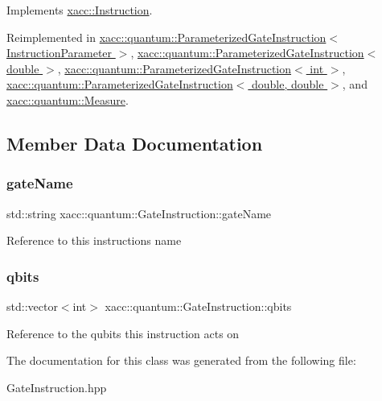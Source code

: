 Implements \hyperlink{a02460_ae94c2d089908294c1d410b14c96817ae}{xacc\+::\+Instruction}.



Reimplemented in \hyperlink{a01280_aaccc4a20d58d2ac5c31abe7e325b8f77}{xacc\+::quantum\+::\+Parameterized\+Gate\+Instruction$<$ Instruction\+Parameter $>$}, \hyperlink{a01280_aaccc4a20d58d2ac5c31abe7e325b8f77}{xacc\+::quantum\+::\+Parameterized\+Gate\+Instruction$<$ double $>$}, \hyperlink{a01280_aaccc4a20d58d2ac5c31abe7e325b8f77}{xacc\+::quantum\+::\+Parameterized\+Gate\+Instruction$<$ int $>$}, \hyperlink{a01280_aaccc4a20d58d2ac5c31abe7e325b8f77}{xacc\+::quantum\+::\+Parameterized\+Gate\+Instruction$<$ double, double $>$}, and \hyperlink{a01312_a1c51a5d68294dcb2ba1a9fbea63a730f}{xacc\+::quantum\+::\+Measure}.



\subsection{Member Data Documentation}
\mbox{\label{a01276_a9961e6979139ced70300188cf2e4ad3f}} 
\subsubsection{\texorpdfstring{gate\+Name}{gateName}}
{\footnotesize\ttfamily std\+::string xacc\+::quantum\+::\+Gate\+Instruction\+::gate\+Name\hspace{0.3cm}{\ttfamily [protected]}}

Reference to this instructions name \mbox{\label{a01276_a2a56be6c2519ea65df4d06f4abae1393}} 
\subsubsection{\texorpdfstring{qbits}{qbits}}
{\footnotesize\ttfamily std\+::vector$<$int$>$ xacc\+::quantum\+::\+Gate\+Instruction\+::qbits\hspace{0.3cm}{\ttfamily [protected]}}

Reference to the qubits this instruction acts on 

The documentation for this class was generated from the following file\+:\begin{DoxyCompactItemize}
\item 
Gate\+Instruction.\+hpp\end{DoxyCompactItemize}
